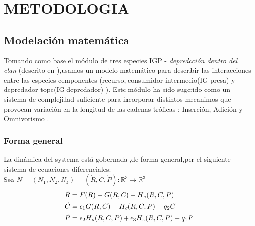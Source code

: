\section{METODOLOGIA}

\subsection{Modelaci\'on matem\'atica}

Tomando como base el m\'odulo de tres especies  IGP - \emph{depredaci\'on dentro del clan}-(descrito en \citealt{polis1989ecology,polis1992intraguild}),usamos un modelo matem\'atico \citep{holt1997theoretical} para describir las interacciones entre las especies componentes (recurso, consumidor intermedio(IG presa) y depredador tope(IG depredador) ). Este m\'odulo ha sido sugerido como un sistema de complejidad suficiente para incorporar distintos mecanimos que provocan variaci\'on en la longitud de las cadenas tr\'oficas : Inserci\'on, Adici\'on y Omnivorismo \citep{TP2007proximate}.

\subsubsection{Forma general}
La din\'amica del systema est\'a gobernada ,de forma general,por el siguiente sistema de ecuaciones diferenciales: \\
Sea $ N= (N_1,N_2,N_3) = (\dot{R} , \dot{C} , \dot{P}) : \mathbb{R}^3 \to \mathbb{R}^3 $
\begin{equation}\label{eq:Gsystem}
\begin{aligned}
&\dot{R} = F(R) -G(R,C)-H_{\textit{\tiny R}}(R,C,P)  \\
&\dot{C} = \epsilon_1 G(R,C)-H_{\textit{\tiny C}}(R,C,P) - q_2 C  \\
&\dot{P} = \epsilon_2 H_{\textit{\tiny R}}(R,C,P) +\epsilon_3 H_{\textit{\tiny C}}(R,C,P) -q_1 P
\end{aligned}
\end{equation}
